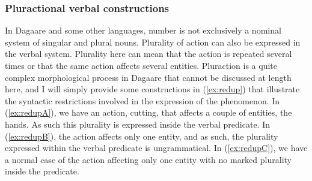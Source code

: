 
\subsubsection{Pluractional verbal constructions}
In Dagaare and some other languages, number is not exclusively a nominal system of
singular and plural nouns. Plurality of action can also be expressed in the verbal system.
Plurality here can mean that the action is repeated several times or that the same action affects
several entities. Pluraction is a quite complex morphological process in Dagaare that cannot
be discussed at length here, and I will simply provide some constructions in (\ref{ex:redup}) that illustrate
the syntactic restrictions involved in the expression of the phenomenon.
In (\ref{ex:redupA}), we have an action, cutting, that affects a couple of entities, the hands. As
such this plurality is expressed inside the verbal predicate. In (\ref{ex:redupB}), the action affects only
one entity, and as such, the plurality expressed within the verbal predicate is ungrammatical.
In (\ref{ex:redupC}), we have a normal case of the action affecting only one entity with no marked
plurality inside the predicate.

